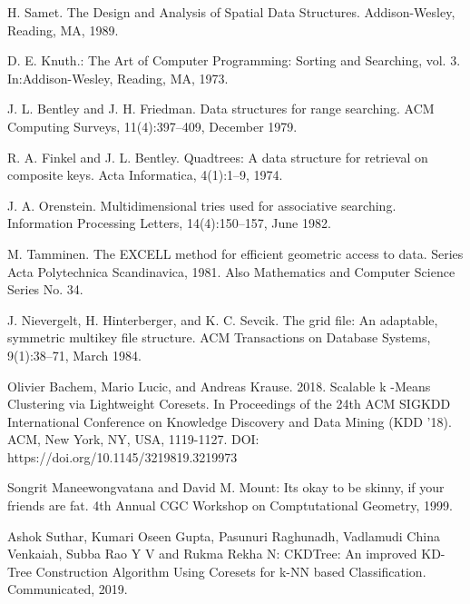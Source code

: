 %
%
% 
% 
%
\begin{thebibliography}{99.}%
%
%

 H. Samet. The Design and Analysis of Spatial Data Structures. Addison-Wesley, Reading, MA, 1989.

 D. E. Knuth.: The Art of Computer Programming: Sorting and Searching, vol. 3. In:Addison-Wesley, Reading, MA, 1973.

 J. L. Bentley and J. H. Friedman. Data structures for range searching. ACM Computing Surveys, 11(4):397–409, December 1979.

 R. A. Finkel and J. L. Bentley. Quadtrees: A data structure for retrieval on composite keys. Acta Informatica, 4(1):1–9, 1974.

 J. A. Orenstein. Multidimensional tries used for associative searching. Information Processing Letters, 14(4):150–157, June 1982.

 M. Tamminen. The EXCELL method for efficient geometric access to data. Series Acta Polytechnica Scandinavica, 1981. Also Mathematics and Computer Science Series No. 34.

 J. Nievergelt, H. Hinterberger, and K. C. Sevcik. The grid file: An adaptable, symmetric multikey file structure. ACM Transactions on Database Systems, 9(1):38–71, March 1984.

 Olivier Bachem, Mario Lucic, and Andreas Krause. 2018. Scalable k -Means Clustering via Lightweight Coresets. In Proceedings of the 24th ACM SIGKDD International Conference on Knowledge Discovery and Data Mining (KDD '18). ACM, New York, NY, USA, 1119-1127. DOI: https://doi.org/10.1145/3219819.3219973

 Songrit Maneewongvatana and David M. Mount: Its okay to be skinny, if your friends are fat. 4th Annual CGC Workshop on Comptutational Geometry, 1999.

 Ashok Suthar, Kumari Oseen Gupta, Pasunuri Raghunadh, Vadlamudi China Venkaiah, Subba Rao Y V and Rukma Rekha N: CKDTree: An improved KD-Tree Construction Algorithm Using Coresets for k-NN based Classification. Communicated, 2019.


\end{thebibliography}
